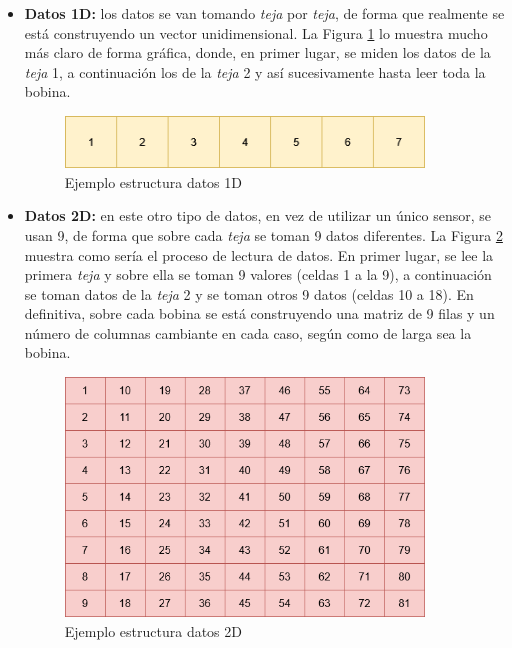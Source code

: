 \begin{itemize}
    \item \textbf{Datos 1D:} los datos se van tomando \emph{teja} por \emph{teja}, de forma que realmente se está construyendo un vector unidimensional. La Figura \ref{f:datos1D} lo muestra mucho más claro de forma gráfica, donde, en primer lugar, se miden los datos de la \emph{teja} 1, a continuación los de la \emph{teja} 2 y así sucesivamente hasta leer toda la bobina.
    \begin{figure}[h]
     \centering
      \includegraphics[width=0.9\textwidth]{img/1D.png}
     \caption{Ejemplo estructura datos 1D}
     \label{f:datos1D}
    \end{figure}
    \item \textbf{Datos 2D:} en este otro tipo de datos, en vez de utilizar un único sensor, se usan 9, de forma que sobre cada \emph{teja} se toman 9 datos diferentes. La Figura \ref{f:datos2D} muestra como sería el proceso de lectura de datos. En primer lugar, se lee la primera \emph{teja} y sobre ella se toman 9 valores (celdas 1 a la 9), a continuación se toman datos de la \emph{teja} 2 y se toman otros 9 datos (celdas 10 a 18). En definitiva, sobre cada bobina se está construyendo una matriz de 9 filas y un número de columnas cambiante en cada caso, según como de larga sea la bobina.
    \begin{figure}[h]
     \centering
      \includegraphics[width=0.9\textwidth]{img/2D.png}
     \caption{Ejemplo estructura datos 2D}
     \label{f:datos2D}
    \end{figure}
    \end{itemize}

